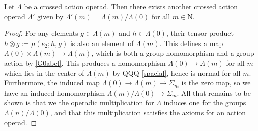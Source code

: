 \documentclass{amsbook} %
\numberwithin{section}{chapter}
\begin{document}
\begin{prop} \label{G0quot} Let $\Lambda$ be a crossed action operad. Then there exists another crossed action operad $\Lambda'$ given by $\Lambda'(m) = \Lambda(m)/\Lambda(0)$ for all $m \in \mathrm{N}$.
\end{prop}
\begin{proof}
For any elements $g \in \Lambda(m)$ and $h \in \Lambda(0)$, their tensor product $h \otimes g := \mu(e_2; h, g)$ is also an element of $\Lambda(m)$. This defines a map $\Lambda(0) \times \Lambda(m) \to \Lambda(m)$, which is both a group homomorphism and a group action by \cref{G0abel}. This produces a homomorphism $\Lambda(0) \to \Lambda(m)$ for all $m$ which lies in the center of $\Lambda(m)$ by QQQ \cref{spacial}, hence is normal for all $m$. Furthermore, the induced map $\Lambda(0) \to \Lambda(m) \to \Sigma_m$ is the zero map, so we have an induced homomorphism $\Lambda(m)/\Lambda(0) \to \Sigma_m$. All that remains to be shown is that we the operadic multiplication for $\Lambda$ induces one for the groups $\Lambda(n)/\Lambda(0)$, and that this multiplication satisfies the axioms for an action operad.


\end{proof}
\end{document}
